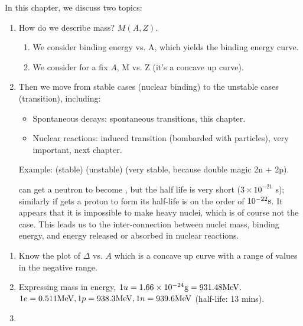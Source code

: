 \documentclass{school-22.101-notes}
\date{November 9, 2011}
\begin{document}
\maketitle


In this chapter, we discuss two topics: 
\begin{enumerate}
\item How do we describe mass? $M(A,Z)$. 
  \begin{enumerate}
  \item We consider binding energy vs. A, which yields the binding energy curve. 
  \item We consider for a fix $A$, M vs. Z (it's a concave up curve). 
  \end{enumerate}

\item Then we move from stable cases (nuclear binding) to the unstable cases (transition), including:
  \begin{itemize}
  \item Spontaneous decays: spontaneous transitions, this chapter. 
  \item Nuclear reactions: induced transition (bombarded with particles), very important, next chapter.   
  \end{itemize}
Example:  (stable)   (unstable)  (very stable, because double magic 2n + 2p). 

 can get a neutron to become , but the half life is very short ($3 \times 10^{-21}$ s); similarly if  gets a proton to form  its half-life is on the order of $10^{-22} \mathrm{s}$. It appears that it is impossible to make heavy nuclei, which is of course not the case. This leads us to the inter-connection between nuclei mass, binding energy, and energy released or absorbed in nuclear reactions.
\end{enumerate}




\begin{enumerate}
\item Know the plot of $\Delta$ vs. $A$ which is a concave up curve with a range of values in the negative range. 

\item Expressing mass in energy, $1 u = 1.66 \times 10^{-24} \mathrm{g} = 931.48 \mathrm{MeV}$. $1 e = 0.511 \mathrm{MeV}, 1 p = 938.3 \mathrm{MeV}, 1 n = 939.6 \mathrm{MeV}$ (half-life: 13 mins). 

\item 
\end{enumerate}
\end{document}
